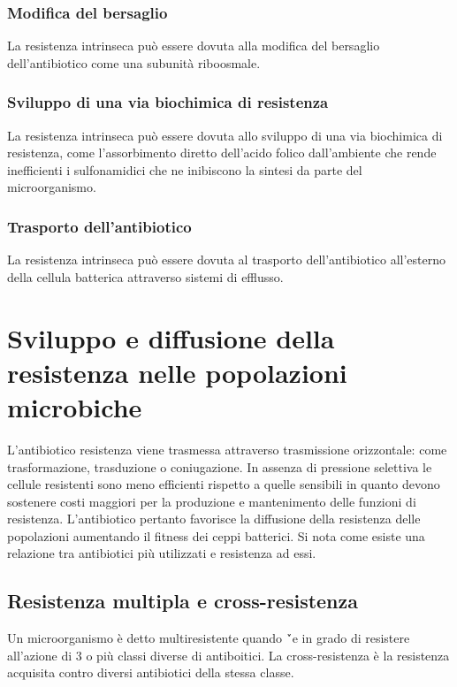 		\subsubsection{Modifica del bersaglio}
		La resistenza intrinseca pu\`o essere dovuta alla modifica del bersaglio dell'antibiotico come una subunit\`a riboosmale.

		\subsubsection{Sviluppo di una via biochimica di resistenza}
		La resistenza intrinseca pu\`o essere dovuta allo sviluppo di una via biochimica di resistenza, come l'assorbimento diretto dell'acido folico dall'ambiente che rende inefficienti i sulfonamidici che ne inibiscono la sintesi da parte del microorganismo.

		\subsubsection{Trasporto dell'antibiotico}
		La resistenza intrinseca pu\`o essere dovuta al trasporto dell'antibiotico all'esterno della cellula batterica attraverso sistemi di efflusso.

\section{Sviluppo e diffusione della resistenza nelle popolazioni microbiche}
L'antibiotico resistenza viene trasmessa attraverso trasmissione orizzontale: come trasformazione, trasduzione o coniugazione.
In assenza di pressione selettiva le cellule resistenti sono meno efficienti rispetto a quelle sensibili in quanto devono sostenere costi maggiori per la produzione e mantenimento delle funzioni di resistenza.
L'antibiotico pertanto favorisce la diffusione della resistenza delle popolazioni aumentando il fitness dei ceppi batterici.
Si nota come esiste una relazione tra antibiotici pi\`u utilizzati e resistenza ad essi.

	\subsection{Resistenza multipla e cross-resistenza}
	Un microorganismo \`e detto multiresistente quando \'`e in grado di resistere all'azione di $3$ o pi\`u classi diverse di antiboitici.
	La cross-resistenza \`e la resistenza acquisita contro diversi antibiotici della stessa classe.

